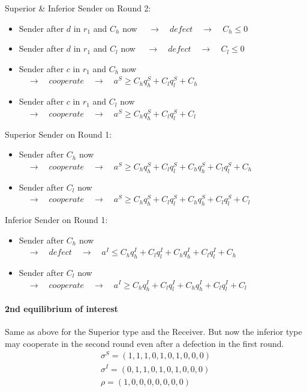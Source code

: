\documentclass[11pt]{article}
\theoremstyle{plainCl1}
\begin{document}
Superior \& Inferior Sender on Round 2:
\begin{itemize} [noitemsep]
	\item Sender after $d$ in $r_1$ and $C_h$ now $\quad \rightarrow \quad defect \quad \rightarrow \quad C_h \leq 0$\\
	\item Sender after $d$ in $r_1$ and $C_l$ now $\quad \rightarrow \quad defect \quad \rightarrow \quad C_l \leq 0$\\
	\item Sender after $c$ in $r_1$ and $C_h$ now $\quad \rightarrow \quad cooperate \quad \rightarrow \quad a^S \geq C_h q^S_h + C_l q^S_l + C_h$\\
	\item Sender after $c$ in $r_1$ and $C_l$ now $\quad \rightarrow \quad cooperate \quad \rightarrow \quad a^S \geq C_h q^S_h + C_l q^S_l + C_l$\\
\end{itemize}
Superior Sender on Round 1:
\begin{itemize} [noitemsep]
	\item Sender after $C_h$ now $\quad \rightarrow \quad cooperate \quad \rightarrow \quad a^S \geq C_h q^S_h + C_l q^S_l  + C_h q^S_h + C_l q^S_l + C_h$\\
	\item Sender after $C_l$ now $\quad \rightarrow \quad cooperate \quad \rightarrow \quad a^S \geq C_h q^S_h + C_l q^S_l  + C_h q^S_h + C_l q^S_l + C_l$\\
\end{itemize}
Inferior Sender on Round 1:
\begin{itemize} [noitemsep]
	\item Sender after $C_h$ now $\quad \rightarrow \quad defect \quad \rightarrow \quad a^I \leq C_h q^I_h + C_l q^I_l  + C_h q^I_h + C_l q^I_l + C_h$\\
	\item Sender after $C_l$ now $\quad \rightarrow \quad cooperate \quad \rightarrow \quad a^I \geq C_h q^I_h + C_l q^I_l  + C_h q^I_h + C_l q^I_l + C_l$\\
\end{itemize}


\paragraph{2nd equilibrium of interest} 
Same as above for the Superior type and the Receiver. But now the inferior type may cooperate in the second round even after a defection in the first round.\\
	\begin{equation}\label{strategies}
	\begin{array}{l}	
	\sigma^S = (1, 1, 1, 0, 1, 0, 1, 0, 0, 0)\\
	\sigma^I = (0, 1, 1, 0, 1, 0, 1, 0, 0, 0)\\
	\rho = (1, 0, 0, 0, 0, 0, 0, 0)
	\end{array}
	\end{equation}
\end{document}
